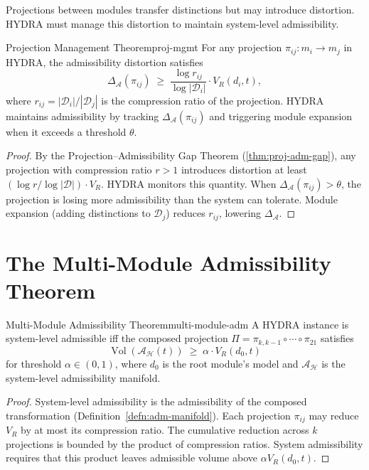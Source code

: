 \documentclass[12pt,twoside,openright]{book}
\newcommand{\adm}{\mathcal{A}}
\newcommand{\Vol}{\operatorname{Vol}}
\begin{document}
Projections between modules transfer distinctions but may
introduce distortion. HYDRA must manage this distortion
to maintain system-level admissibility.

\begin{theorem}{Projection Management Theorem}{proj-mgmt}
  For any projection $\pi_{ij} : m_i \to m_j$ in HYDRA,
  the admissibility distortion satisfies
  \[
    \Delta_\adm(\pi_{ij})
    \;\ge\;
    \frac{\log r_{ij}}{\log |\mathcal{D}_i|}
    \cdot V_R(d_i, t),
  \]
  where $r_{ij} = |\mathcal{D}_i| / |\mathcal{D}_j|$
  is the compression ratio of the projection.
  HYDRA maintains admissibility by tracking
  $\Delta_\adm(\pi_{ij})$ and triggering module expansion
  when it exceeds a threshold $\theta$.
\end{theorem}

\begin{proof}
  By the Projection--Admissibility Gap Theorem
  (\cref{thm:proj-adm-gap}), any projection with
  compression ratio $r > 1$ introduces distortion at
  least $(\log r / \log |\mathcal{D}|) \cdot V_R$.
  HYDRA monitors this quantity. When
  $\Delta_\adm(\pi_{ij}) > \theta$, the projection is
  losing more admissibility than the system can tolerate.
  Module expansion (adding distinctions to $\mathcal{D}_j$)
  reduces $r_{ij}$, lowering $\Delta_\adm$.
\end{proof}

\section{The Multi-Module Admissibility Theorem}

\begin{theorem}{Multi-Module Admissibility Theorem}{multi-module-adm}
  A HYDRA instance is system-level admissible iff
  the composed projection
  $\Pi = \pi_{k,k-1} \circ \cdots \circ \pi_{21}$
  satisfies
  \[
    \Vol(\adm_\mathcal{H}(t)) \;\ge\; \alpha \cdot V_R(d_0, t)
  \]
  for threshold $\alpha \in (0,1)$, where $d_0$ is the
  root module's model and $\adm_\mathcal{H}$ is the
  system-level admissibility manifold.
\end{theorem}

\begin{proof}
  System-level admissibility is the admissibility of the
  composed transformation (Definition~\ref{defn:adm-manifold}).
  Each projection $\pi_{ij}$ may reduce $V_R$ by at most
  its compression ratio.
  The cumulative reduction across $k$ projections is
  bounded by the product of compression ratios.
  System admissibility requires that this product
  leaves admissible volume above $\alpha V_R(d_0, t)$.
\end{proof}
\end{document}
